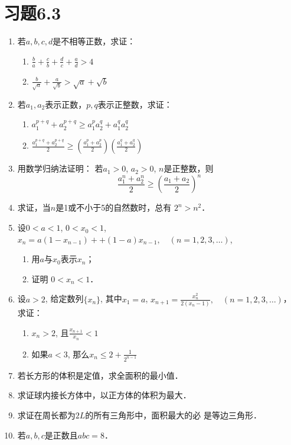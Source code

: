 \section*{习题6.3}

\begin{enumerate}
   \item  若$a,b,c,d$是不相等正数，求证：
\begin{enumerate}
    \item $\frac{b}{a}+\frac{c}{b}+\frac{d}{c}+\frac{a}{d}>4$
    \item $\frac{b}{\sqrt{a}}+\frac{a}{\sqrt{b}}>\sqrt{a}+\sqrt{b}$
\end{enumerate}
   \item  若$a_1,a_2$表示正数，$p,q$表示正整数，求证：
\begin{enumerate}
    \item $a_1^{p+q}+a_2^{p+q}\ge a_1^pa_2^q+a_1^qa_2^q$
    \item $\frac{a_1^{p+q}+a_2^{p+q}}{2}\ge \left(\frac{a_1^p+a_2^p}{2}\right)\left(\frac{a_1^q+a_2^q}{2}\right)$
\end{enumerate}

\item 用数学归纳法证明：
若$a_1>0$, $a_2>0$, $n$是正整数，则
\[\frac{a_1^n+a_2^n}{2}\ge \left(\frac{a_1+a_2}{2}\right)^n\]
\item 求证，当$n$是1或不小于5的自然数时，总有
$2^n>n^2$．
\item 设$0<a<1$, $0<x_0<1$, $x_n=a(1-x_{n-1})+
+(1-a)x_{n-1},\quad (n=1,2,3,\ldots)$,
\begin{enumerate}
    \item 用$a$与$x_0$表示$x_n$；
    \item 证明 $0<x_n<1$．
\end{enumerate}

\item 设$a>2$, 给定数列$\{x_n\}$, 其中$x_1=a$, $x_{n+1}=\frac{x^2_n}{2(x_n-1)},\quad (n=1,2,3,\ldots)$，
求证：
\begin{enumerate}
    \item $x_n>2$, 且$\frac{x_{n+1}}{x_n}<1$
\item 如果$a<3$, 那么$x_n\le 2+\frac{1}{2^{n-1}}$
\end{enumerate}

\item 若长方形的体积是定值，求全面积的最小值．
\item 求证球内接长方体中，以正方体的体积为最大．
\item 求证在周长都为$2L$的所有三角形中，面积最大的必
是等边三角形．
\item 若$a,b,c$是正数且$abc=8$．


\end{enumerate}

